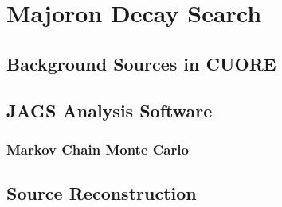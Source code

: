 \chapter{Majoron Decay Search}

\section{Background Sources in CUORE}

\section{JAGS Analysis Software}
\subsection{Markov Chain Monte Carlo}

\section{Source Reconstruction}